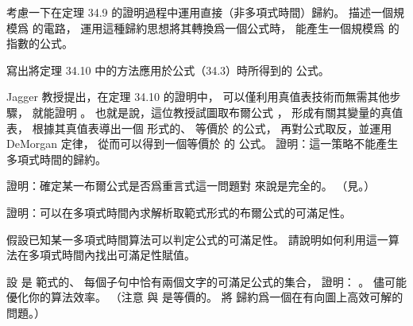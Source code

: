 \startsection[
  title={NP-completeness proofs},
]

\startEXERCISE
考慮一下在定理 34.9 的證明過程中運用直接（非多項式時間）歸約。
描述一個規模爲  的電路，
運用這種歸約思想將其轉換爲一個公式時，
能產生一個規模爲  的指數的公式。
\stopEXERCISE

\startANSWER
{}
\stopANSWER

\startEXERCISE
寫出將定理 34.10 中的方法應用於公式（34.3）時所得到的  公式。
\stopEXERCISE

\startANSWER
{}
\stopANSWER

\startEXERCISE
Jagger 教授提出，在定理 34.10 的證明中，
可以僅利用真值表技術而無需其他步驟，
就能證明 。
也就是說，這位教授試圖取布爾公式 \m{\phi}，
形成有關其變量的真值表，
根據其真值表導出一個  形式的、
等價於 \m{\neg \phi} 的公式，
再對公式取反，並運用 DeMorgan 定律，
從而可以得到一個等價於 \m{\phi} 的  公式。
證明：這一策略不能產生多項式時間的歸約。
\stopEXERCISE

\startANSWER
{}
\stopANSWER

\startEXERCISE
證明：確定某一布爾公式是否爲重言式這一問題對  來說是完全的。
（\hint 見\inexercise[34.3-7]。）
\stopEXERCISE

\startANSWER
{}
\stopANSWER

\startEXERCISE
證明：可以在多項式時間內求解析取範式形式的布爾公式的可滿足性。
\stopEXERCISE

\startANSWER
{}
\stopANSWER

\startEXERCISE
假設已知某一多項式時間算法可以判定公式的可滿足性。
請說明如何利用這一算法在多項式時間內找出可滿足性賦值。
\stopEXERCISE

\startANSWER
{}
\stopANSWER

\startEXERCISE
設  是  範式的、
每個子句中恰有兩個文字的可滿足公式的集合，
證明： 。
儘可能優化你的算法效率。
（\hint 注意  與  是等價的。
將  歸約爲一個在有向圖上高效可解的問題。）
\stopEXERCISE

\startANSWER
{}
\stopANSWER

\stopsection
